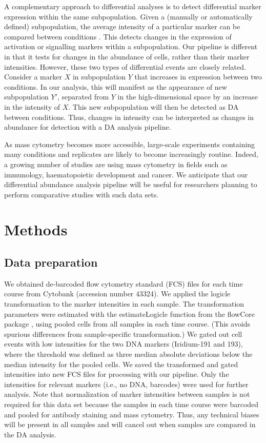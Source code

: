 \documentclass{article}
\begin{document}
A complementary approach to differential analyses is to detect differential marker expression within the same subpopulation.
Given a (manually or automatically defined) subpopulation, the average intensity of a particular marker can be compared between conditions \cite{anchang2016visualization,behbehani2015mass}.
This detects changes in the expression of activation or signalling markers within a subpopulation.
Our pipeline is different in that it tests for changes in the abundance of cells, rather than their marker intensities.
However, these two types of differential events are closely related.
Consider a marker $X$ in subpopulation $Y$ that increases in expression between two conditions. 
In our analysis, this will manifest as the appearance of new subpopulation $Y'$, separated from $Y$ in the high-dimensional space by an increase in the intensity of $X$.
This new subpopulation will then be detected as DA between conditions.
Thus, changes in intensity can be interpreted as changes in abundance for detection with a DA analysis pipeline.

As mass cytometry becomes more accessible, large-scale experiments containing many conditions and replicates are likely to become increasingly routine.
Indeed, a growing number of studies are using mass cytometry in fields such as immunology, haematopoietic development and cancer.
We anticipate that our differential abundance analysis pipeline will be useful for researchers planning to perform comparative studies with such data sets.


\section{Methods}

\subsection{Data preparation}
We obtained de-barcoded flow cytometry standard (FCS) files for each time course from Cytobank \cite{kotecha2010web} (accession number 43324).
We applied the logicle transformation \cite{parks2006new} to the marker intensities in each sample.
The transformation parameters were estimated with the estimateLogicle function from the flowCore package \cite{hahne2009flowcore}, using pooled cells from all samples in each time course.
(This avoids spurious differences from sample-specific transformation.)
We gated out cell events with low intensities for the two DNA markers (Iridium-191 and 193), where the threshold was defined as three median absolute deviations below the median intensity for the pooled cells.
We saved the transformed and gated intensities into new FCS files for processing with our pipeline.
Only the intensities for relevant markers (i.e., no DNA, barcodes) were used for further analysis.
Note that normalization of marker intensities between samples is not required for this data set because the samples in each time course were barcoded and pooled for antibody staining and mass cytometry.
Thus, any technical biases will be present in all samples and will cancel out when samples are compared in the DA analysis.
\end{document}
